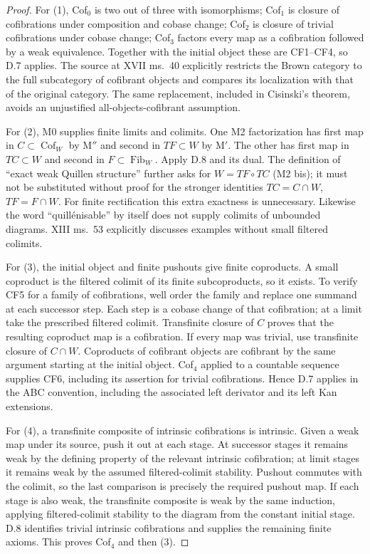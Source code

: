 \begin{proof}
For (1), Cof$_0$ is two out of three with isomorphisms; Cof$_1$ is
closure of cofibrations under composition and cobase change;
Cof$_2$ is closure of trivial cofibrations under cobase change;
Cof$_3$ factors every map as a cofibration followed by a weak
equivalence. Together with the initial object these are CF1--CF4,
so D.7 applies. The source at XVII ms.~40 explicitly restricts the
Brown category to the full subcategory of cofibrant objects and
compares its localization with that of the original category.
The same replacement, included in Cisinski's theorem, avoids an
unjustified all-objects-cofibrant assumption.

For (2), M0 supplies finite limits and colimits. One M2 factorization
has first map in $C\subset\operatorname{Cof}_W$ by M$''$ and second
in $TF\subset W$ by M$'$. The other has first map in
$TC\subset W$ and second in $F\subset\operatorname{Fib}_W$.
Apply D.8 and its dual. The definition of ``exact weak Quillen
structure'' further asks for $W=TF\circ TC$ (M2 bis); it must not
be substituted without proof for the stronger identities
$TC=C\cap W$, $TF=F\cap W$. For finite rectification this extra
exactness is unnecessary. Likewise the word ``quill\'enisable'' by
itself does not supply colimits of unbounded diagrams. XIII
ms.~53 explicitly discusses examples without small filtered
colimits.

For (3), the initial object and finite pushouts give finite
coproducts. A small coproduct is the filtered colimit of its finite
subcoproducts, so it exists. To verify CF5 for a family of
cofibrations, well order the family and replace one summand at each
successor step. Each step is a cobase change of that cofibration;
at a limit take the prescribed filtered colimit. Transfinite closure
of $C$ proves that the resulting coproduct map is a cofibration.
If every map was trivial, use transfinite closure of $C\cap W$.
Coproducts of cofibrant objects are cofibrant by the same argument
starting at the initial object. Cof$_4$ applied to a countable
sequence supplies CF6, including its assertion for trivial
cofibrations. Hence D.7 applies in the ABC convention, including
the associated left derivator and its left Kan extensions.

For (4), a transfinite composite of intrinsic cofibrations is
intrinsic. Given a weak map under its source, push it out at each
stage. At successor stages it remains weak by the defining property
of the relevant intrinsic cofibration; at limit stages it remains
weak by the assumed filtered-colimit stability. Pushout commutes
with the colimit, so the last comparison is precisely the required
pushout map. If each stage is also weak, the transfinite composite
is weak by the same induction, applying filtered-colimit stability
to the diagram from the constant initial stage. D.8 identifies
trivial intrinsic cofibrations and supplies the remaining finite
axioms. This proves Cof$_4$ and then (3).


\end{proof}
